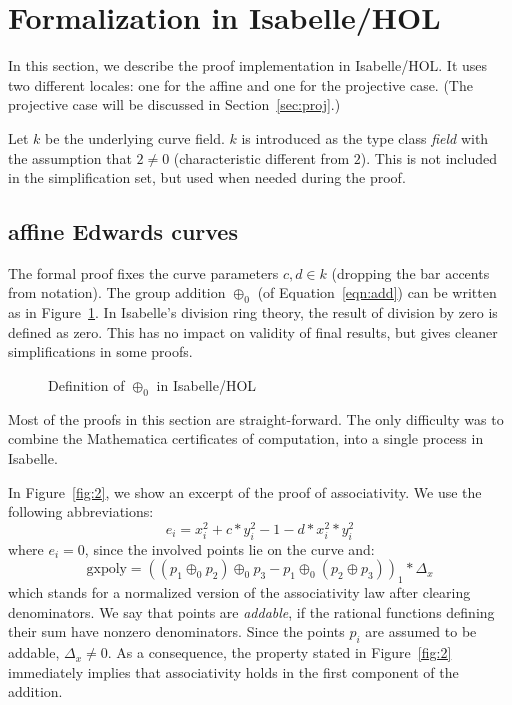 \documentclass{llncs}
\begin{document}
\section{Formalization in Isabelle/HOL}

In this section, we describe the proof implementation in Isabelle/HOL. It
uses two different locales: one for the affine and one for the
projective case. (The projective case will be discussed in Section~\ref{sec:proj}.)

Let $k$ be the underlying curve field. $k$ is introduced as the type
class \textit{field} with the assumption that $2 \neq 0$
(characteristic different from $2$). This is not included in the
simplification set, but used when needed during the proof.


\subsection{affine Edwards curves}

The formal proof fixes the curve parameters $c,d \in k$ (dropping the
bar accents from notation). The group addition $\oplus_0$ (of
Equation~\ref{eqn:add}) can be written as in Figure~\ref{fig:1}.  In
Isabelle's division ring theory, the result of division by zero is
defined as zero. This has no impact on validity of final results, but
gives cleaner simplifications in some proofs.

\begin{figure}
	{}
	\caption{Definition of $\oplus_0$ in Isabelle/HOL}
	\label{fig:1}
\end{figure}

Most of the proofs in this section are straight-forward. The only
difficulty was to combine the Mathematica certificates of computation, 
into a single process in Isabelle.

In Figure~\ref{fig:2}, we show an excerpt of the proof of
associativity. We use the following abbreviations: 
\[
e_i = x_i^2 + c *
y_i^2 - 1 - d * x_i^2 * y_i^2 
\] 
where $e_i = 0$, since the involved
points lie on the curve and: 
\[
\text{gxpoly} = ((p_1 \oplus_0 p_2)
\oplus_0 p_3 - p_1 \oplus_0 (p_2 \oplus p_3))_1*\Delta_x
\] 
which stands for a normalized version of the associativity law
after clearing denominators. We say that points are \emph{addable}, if the
rational functions defining their sum have nonzero denominators.
Since the points $p_i$ are assumed to be
addable, $\Delta_x \neq 0$. As a consequence, the property stated in
Figure~\ref{fig:2} immediately implies that associativity holds in the
first component of the addition.
\end{document}
